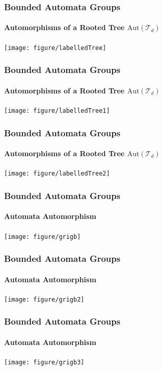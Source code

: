 \documentclass[11pt]{beamer}
\begin{document}



\begin{frame}
\frametitle{Bounded Automata Groups}
\framesubtitle{\large Automorphisms of a Rooted Tree $\mathrm{Aut}(\mathcal{T}_d)$}
\hspace{2em}\texttt{[image: figure/labelledTree]}
\end{frame}

\begin{frame}
\frametitle{Bounded Automata Groups}
\framesubtitle{\large Automorphisms of a Rooted Tree $\mathrm{Aut}(\mathcal{T}_d)$}
\hspace{2em}\texttt{[image: figure/labelledTree1]}
\end{frame}

\begin{frame}
\frametitle{Bounded Automata Groups}
\framesubtitle{\large Automorphisms of a Rooted Tree $\mathrm{Aut}(\mathcal{T}_d)$}
\hspace{2em}\texttt{[image: figure/labelledTree2]}
\end{frame}

\begin{frame}
\frametitle{Bounded Automata Groups}
\framesubtitle{\large Automata Automorphism}
\hspace{2em}\texttt{[image: figure/grigb]}
\end{frame}

\begin{frame}
\frametitle{Bounded Automata Groups}
\framesubtitle{\large Automata Automorphism}
\hspace{2em}\texttt{[image: figure/grigb2]}
\end{frame}


\begin{frame}
\frametitle{Bounded Automata Groups}
\framesubtitle{\large Automata Automorphism}
\hspace{2em}\texttt{[image: figure/grigb3]}
\end{frame}
\end{document}
